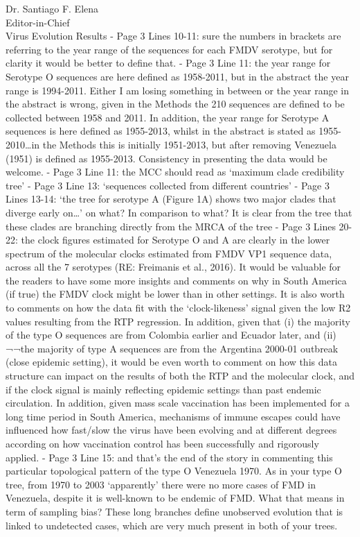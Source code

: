 \documentclass[12pt, a4paper]{letter} %
\begin{document}
\begin{letter}{
	Dr. Santiago F. Elena\\
    Editor-in-Chief \\
    Virus Evolution
}
Results
-       Page 3 Lines 10-11: sure the numbers in brackets are referring to the year range of the sequences for each FMDV serotype, but for clarity it would be better to define that.
-       Page 3 Line 11: the year range for Serotype O sequences are here defined as 1958-2011, but in the abstract the year range is 1994-2011. Either I am losing something in between or the year range in the abstract is wrong, given in the Methods the 210 sequences are defined to be collected between 1958 and 2011. In addition, the year range for Serotype A sequences is here defined as 1955-2013, whilst in the abstract is stated as 1955-2010…in the Methods this is initially 1951-2013, but after removing Venezuela (1951) is defined as 1955-2013. Consistency in presenting the data would be welcome.
-       Page 3 Line 11: the MCC should read as ‘maximum clade credibility tree’
-       Page 3 Line 13: ‘sequences collected from different countries’
-       Page 3 Lines 13-14: ‘the tree for serotype A (Figure 1A) shows two major clades that diverge early on…’ on what? In comparison to what? It is clear from the tree that these clades are branching directly from the MRCA of the tree
-       Page 3 Lines 20-22: the clock figures estimated for Serotype O and A are clearly in the lower spectrum of the molecular clocks estimated from FMDV VP1 sequence data, across all the 7 serotypes (RE: Freimanis et al., 2016). It would be valuable for the readers to have some more insights and comments on why in South America (if true) the FMDV clock might be lower than in other settings. It is also worth to comments on how the data fit with the ‘clock-likeness’ signal given the low R2 values resulting from the RTP regression. In addition, given that (i) the majority of the type O sequences are from Colombia earlier and Ecuador later, and (ii) ¬¬the majority of type A sequences are from the Argentina 2000-01 outbreak (close epidemic setting), it would be even worth to comment on how this data structure can impact on the results of both the RTP and the molecular clock, and if the clock signal is mainly reflecting epidemic settings than past endemic circulation. In addition, given mass scale vaccination has been implemented for a long time period in South America, mechanisms of immune escapes could have influenced how fast/slow the virus have been evolving and at different degrees according on how vaccination control has been successfully and rigorously applied.
-       Page 3 Line 15: and that’s the end of the story in commenting this particular topological pattern of the type O Venezuela 1970. As in your type O tree, from 1970 to 2003 ‘apparently’ there were no more cases of FMD in Venezuela, despite it is well-known to be endemic of FMD. What that means in term of sampling bias? These long branches define unobserved evolution that is linked to undetected cases, which are very much present in both of your trees.

\end{letter}
\end{document}
